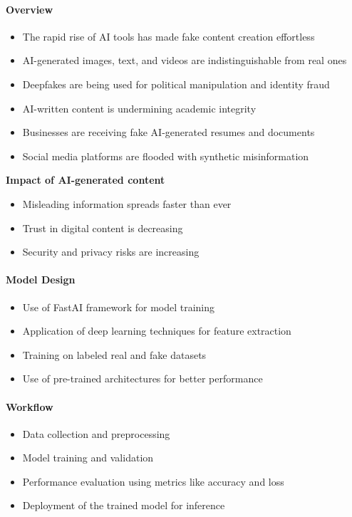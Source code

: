 
{ 
	\framesubtitle{Overview}
	
	\begin{itemize}
		\item The rapid rise of AI tools has made fake content creation effortless
		\item AI-generated images, text, and videos are indistinguishable from real ones
		\item Deepfakes are being used for political manipulation and identity fraud
		\item AI-written content is undermining academic integrity
		\item Businesses are receiving fake AI-generated resumes and documents
		\item Social media platforms are flooded with synthetic misinformation
	\end{itemize}
}

{ 
	\textbf{Impact of AI-generated content}
	
	\begin{itemize}
		\item Misleading information spreads faster than ever
		\item Trust in digital content is decreasing
		\item Security and privacy risks are increasing
	\end{itemize}
}


{
	\framesubtitle{Model Design}
	
	\begin{itemize}
		\item Use of FastAI framework for model training
		\item Application of deep learning techniques for feature extraction
		\item Training on labeled real and fake datasets
		\item Use of pre-trained architectures for better performance
	\end{itemize}
}


{
	\framesubtitle{Workflow}
	
	\begin{itemize}
		\item Data collection and preprocessing
		\item Model training and validation
		\item Performance evaluation using metrics like accuracy and loss
		\item Deployment of the trained model for inference
	\end{itemize}
}

